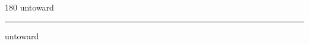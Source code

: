 
\begin{frame}
\begin{center}
\begin{turn}{180}
{\fontsize{2.5cm}{1em}\selectfont untoward}
\end{turn}
\vspace{1em}\par  
\hrule
\vspace{1em}\par  
{\fontsize{2.5cm}{1em}\selectfont untoward}
\end{center}
\end{frame}
